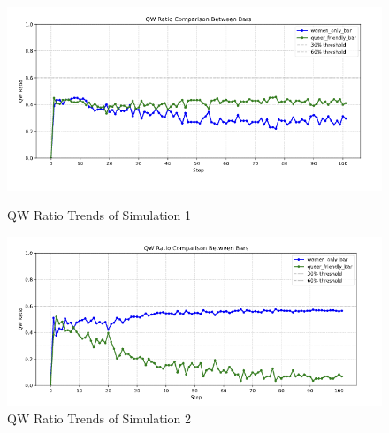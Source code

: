\documentclass{article}
\begin{document}
\begin{figure}[H]
\centering
\begin{minipage}{0.48\textwidth}
  \centering
  \includegraphics[width=\linewidth]{figures/0.5 ratio.png}
  \caption{QW Ratio Trends of Simulation 1}
\end{minipage}
\hfill
\begin{minipage}{0.48\textwidth}
  \centering
  \includegraphics[width=\linewidth]{figures/0.5 ratio2.png}
  \caption{QW Ratio Trends of Simulation 2}
\end{minipage}
\end{figure}
\end{document}
